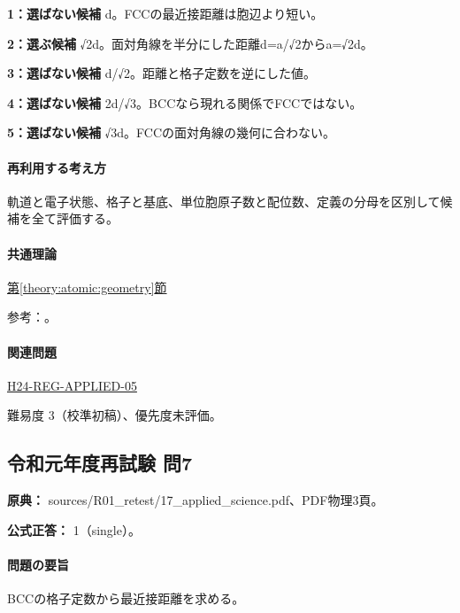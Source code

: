 \noindent\textbf{1：選ばない候補} d。FCCの最近接距離は胞辺より短い。\par

\noindent\textbf{2：選ぶ候補} √2d。面対角線を半分にした距離d=\allowbreak{}a/√2からa=√2d。\par

\noindent\textbf{3：選ばない候補} d/√2。距離と格子定数を逆にした値。\par

\noindent\textbf{4：選ばない候補} 2d/√3。BCCなら現れる関係でFCCではない。\par

\noindent\textbf{5：選ばない候補} √3d。FCCの面対角線の幾何に合わない。\par

\paragraph{再利用する考え方} 軌道と電子状態、格子と基底、単位胞原子数と配位数、定義の分母を区別して候補を全て評価する。

\paragraph{共通理論} \hyperref[theory:atomic:geometry]{第\ref*{theory:atomic:geometry}節}

\par 参考：\cite{openstax_crystals}。

\paragraph{関連問題} \hyperref[q:h24-reg-applied-05]{H24-REG-APPLIED-05}

\par 難易度 3（校準初稿）、優先度未評価。

\subsection{令和元年度再試験 問7}
\label{q:r01-ret-applied-07}

\noindent\textbf{原典：} sources/R01\_retest/17\_applied\_science.pdf、PDF物理3頁。

\textbf{公式正答：} 1（single）。

\paragraph{問題の要旨} BCCの格子定数から最近接距離を求める。


